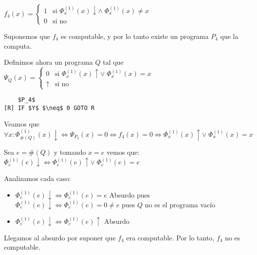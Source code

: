 $f_4(x) = \begin{cases}
    1 & \text{si } \Phi_x^{(1)}(x) \downarrow \land \; \Phi_x^{(1)}(x) \neq x \\
    0 & \text{si no}
\end{cases}$

Suponemos que $f_4$ es computable, y por lo tanto existe un programa $P_4$ que la computa.

Definimos ahora un programa $Q$ tal que $\Psi_{Q}(x) = \begin{cases}
    0 & \text{si } \Phi_x^{(1)}(x) \uparrow \lor \; \Phi_x^{(1)}(x) = x \\
    \uparrow & \text{si no}
\end{cases}$

\begin{lstlisting}
    $P_4$
[R] IF $Y$ $\neq$ 0 GOTO R
\end{lstlisting}

Veamos que $\forall x: \Phi_{\#(Q)}^{(1)}(x) \downarrow \iff \Psi_{P_4}(x) = 0 \iff f_4(x) = 0 \iff \Phi_x^{(1)}(x) \uparrow \lor \; \Phi_x^{(1)}(x) = x$

Sea $e = \#(Q)$ y tomando $x = e$ vemos que: $\Phi_e^{(1)}(e) \downarrow \iff \Phi_e^{(1)}(e) \uparrow \lor \; \Phi_e^{(1)}(e) = e$

Analizamos cada caso:

\begin{itemize}
    \item $\Phi_e^{(1)}(e) \downarrow \iff \Phi_e^{(1)}(e) = e$ Absurdo pues $\Phi_e^{(1)}(e) \downarrow \iff \Phi_e^{(1)}(e) = 0 \neq e$ pues $Q$ no es el programa vacío
    \item $\Phi_e^{(1)}(e) \downarrow \iff \Phi_e^{(1)}(e) \uparrow$ Absurdo
\end{itemize}

Llegamos al absurdo por suponer que $f_4$ era computable. Por lo tanto, $f_4$ no es computable.
